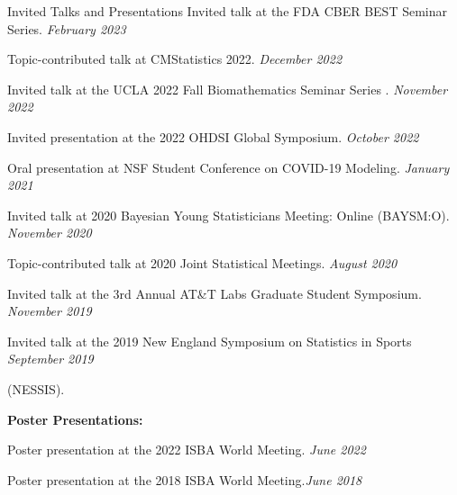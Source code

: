 \documentclass{resume} %
\begin{document}
\begin{rSection}{Invited Talks and Presentations}
	Invited talk at the FDA CBER BEST Seminar Series. \hfill {\em February 2023}
	
	Topic-contributed talk at CMStatistics 2022. \hfill {\em December 2022}
	
	Invited talk at the UCLA 2022 Fall Biomathematics Seminar Series . \hfill {\em November 2022}
	
	Invited presentation at the 2022 OHDSI Global Symposium.  \hfill {\em October 2022}
	
	{Oral presentation at NSF Student Conference on COVID-19 Modeling.} \hfill {\em January 2021}
	
	{Invited talk at 2020 Bayesian Young Statisticians Meeting: Online (BAYSM:O).} \hfill {\em November 2020}
	
	{Topic-contributed talk at 2020 Joint Statistical Meetings. } \hfill {\em August 2020}
	
	{Invited talk at the 3rd Annual AT\&T Labs Graduate Student Symposium.} \hfill {\em November 2019}
	
	
	{Invited talk at the 2019 New England Symposium on Statistics in Sports} \hfill {\em September 2019}
	
	\vspace{-0.1in}
	(NESSIS).
	
	
	
	
	
	\medskip
	
	\hspace*{-0.2in}\textbf{Poster Presentations:}
	
	Poster presentation at the 2022 ISBA World Meeting. \hfill {\em June 2022}
	
	
%	
	
	
	
	Poster presentation at the 2018 ISBA World Meeting.\hfill {\em June 2018}
	
	
	
\end{rSection}
\end{document}

